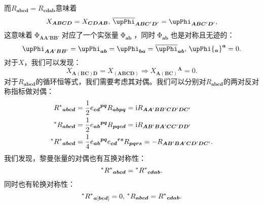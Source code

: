 而$R_{\boldsymbol{abcd}} =R_{\boldsymbol{cdab}}$意味着
\begin{equation}
	X_{\boldsymbol{ABCD}} =X_{\boldsymbol{CDAB}} ,\thinspace \overline{\upPhi }_{\boldsymbol{ABC} '\boldsymbol{D} '} =\upPhi _{\boldsymbol{ABC} '\boldsymbol{D} '} ,
	\label{eq:5.56}
\end{equation}
这意味着$\upPhi _{\boldsymbol{AA} '\boldsymbol{BB} '}$对应了一个实张量$\upPhi _{\boldsymbol{ab}}$，同时$\upPhi _{\boldsymbol{ab}}$也是对称且无迹的：
\begin{equation*}
	\upPhi _{\boldsymbol{AA} '\boldsymbol{BB} '} =\upPhi _{\boldsymbol{ab}} =\upPhi _{\boldsymbol{ba}} =\overline{\upPhi }_{\boldsymbol{ab}} ,\thinspace \upPhi {_{\boldsymbol{a}}}^{\boldsymbol{a}} =0.
\end{equation*}
对于$X$，我们可以发现：
\begin{equation*}
	X_{\boldsymbol{A}(\boldsymbol{BC})\boldsymbol{D}} =X_{(\boldsymbol{ABCD} )} \Rightarrow X{_{\boldsymbol{A}(\boldsymbol{BC})}}^{\boldsymbol{A}} =0.
\end{equation*}
对于$R_{\boldsymbol{abcd}}$的循环恒等式，我们需要考虑其对偶。我们可以分别对$R_{\boldsymbol{abcd}}$的两对反对称指标做对偶：
\begin{equation*}
	\begin{aligned}
		R^{*}{}_{\boldsymbol{abcd}} & =\frac{1}{2} e{_{\boldsymbol{cd}}}^{\boldsymbol{pq}} R_{\boldsymbol{abpq}} =\mathrm{i} R_{\boldsymbol{AA} '\boldsymbol{BB} '\boldsymbol{CD} '\boldsymbol{DC} '}\\
		\prescript{*}{}{} R_{\boldsymbol{abcd}} & =\frac{1}{2} e{_{\boldsymbol{ab}}}^{\boldsymbol{pq}} R_{\boldsymbol{pqcd}} =\mathrm{i} R_{\boldsymbol{AB} '\boldsymbol{BA} '\boldsymbol{CC} '\boldsymbol{DD} '}\\
		\prescript{*}{}{} R^{*}{}_{\boldsymbol{abcd}} & =\frac{1}{4} e{_{\boldsymbol{ab}}}^{\boldsymbol{pq}} e{_{\boldsymbol{cd}}}^{\boldsymbol{rs}} R_{\boldsymbol{pqrs}} =-R_{\boldsymbol{AB} '\boldsymbol{BA} '\boldsymbol{CD} '\boldsymbol{DC} '} .
	\end{aligned}
\end{equation*}
我们发现，黎曼张量的对偶也有互换对称性：
\begin{equation*}
	\prescript{*}{}{} R^{*}{}_{\boldsymbol{abcd}} =\prescript{*}{}{} R^{*}{}_{\boldsymbol{cdab}} .
\end{equation*}
同时也有轮换对称性：
\begin{equation}
	\prescript{*}{}{} R^{*}{}_{\boldsymbol{a}[\boldsymbol{bcd}]} =0,\thinspace \prescript{*}{}{} R_{\boldsymbol{abcd}} =R^{*}{}_{\boldsymbol{cdab}} .
	\label{eq:5.57}
\end{equation}

